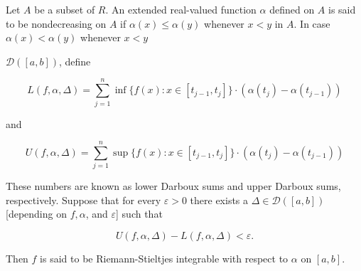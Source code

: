Let $A$ be a subset of $R$. An extended real-valued function $\alpha$ defined on $A$ is said to be nondecreasing on $A$ if $\alpha(x) \leq \alpha(y)$ whenever $x < y$ in $A$. In case $\alpha(x) < \alpha(y)$ whenever $x < y$

$\mathcal{D}([a, b])$, define

$$L(f, \alpha, \Delta) = \sum_{j=1}^{n} \inf \{f(x): x \in [t_{j-1}, t_j]\} \cdot (\alpha(t_j) - \alpha(t_{j-1}))$$

and

$$U(f, \alpha, \Delta) = \sum_{j=1}^{n} \sup \{f(x): x \in [t_{j-1}, t_j]\} \cdot (\alpha(t_j) - \alpha(t_{j-1}))$$

These numbers are known as lower Darboux sums and upper Darboux sums, respectively. Suppose that for every $\varepsilon > 0$ there exists a $\Delta \in \mathcal{D}([a, b])$ [depending on $f, \alpha$, and $\varepsilon$] such that

$$U(f, \alpha, \Delta) - L(f, \alpha, \Delta) < \varepsilon.$$

Then $f$ is said to be Riemann-Stieltjes integrable with respect to $\alpha$ on $[a, b]$.